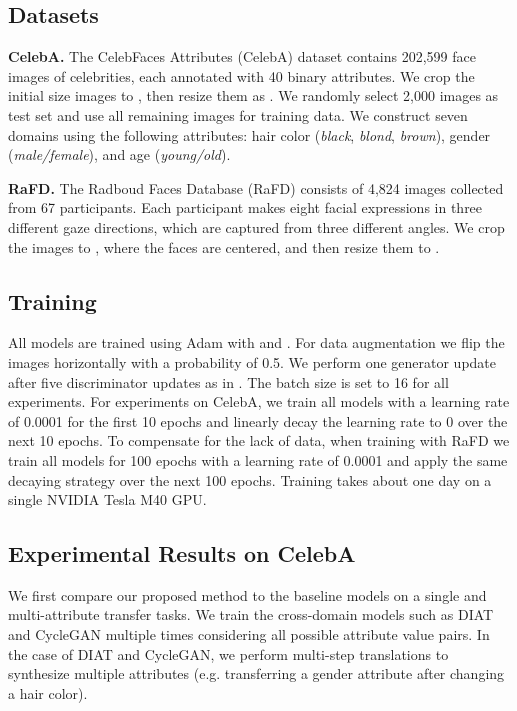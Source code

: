 \documentclass[10pt,twocolumn,letterpaper]{article}
\begin{document}
\medskip

\subsection{Datasets}
\noindent \textbf{CelebA.} The CelebFaces Attributes (CelebA) dataset \cite{liu2015faceattributes} contains 202,599 face images of celebrities, each annotated with 40 binary attributes. We crop the initial  size images to , then resize them as . We randomly select 2,000 images as test set and use all remaining images for training data. We construct seven domains using the following attributes: hair color (\textit{black}, \textit{blond}, \textit{brown}), gender (\textit{male/female}), and age (\textit{young/old}). 

\medskip

\noindent \textbf{RaFD.} The Radboud Faces Database (RaFD) \cite{langner2010presentation} consists of 4,824 images collected from 67 participants. Each participant makes eight facial expressions in three different gaze directions, which are captured from three different angles. We crop the images to ,  where the faces are centered, and then resize them to . 

\medskip

\subsection{Training}
All models are trained using Adam \cite{kingma2014adam} with  and . For data augmentation we flip the images horizontally with a probability of 0.5. We perform one generator update after five discriminator updates as in \cite{gulrajani2017improved}. The batch size is set to 16 for all experiments. For experiments on CelebA,  we train all models with a learning rate of 0.0001 for the first 10 epochs and linearly decay the learning rate to 0 over the next 10 epochs. To compensate for the lack of data, when training with RaFD we train all models for 100 epochs with a learning rate of 0.0001 and apply the same decaying strategy over the next 100 epochs. Training takes about one day on a single NVIDIA Tesla M40 GPU. 

\subsection{Experimental Results on CelebA}
We first compare our proposed method to the baseline models on a single and multi-attribute transfer tasks. We train the cross-domain models such as DIAT and CycleGAN multiple times considering all possible attribute value pairs. 
In the case of DIAT and CycleGAN, we perform multi-step translations to synthesize multiple attributes (e.g. transferring a gender attribute after changing a hair color).
\medskip
\end{document}
